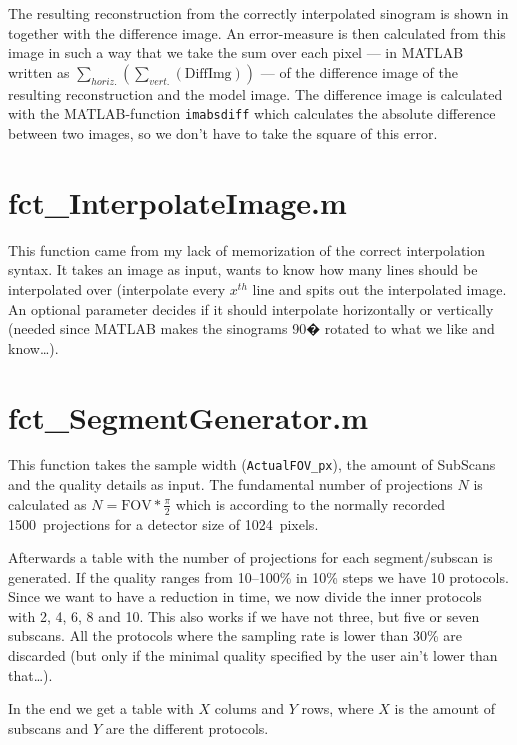 \documentclass{scrartcl}
\begin{document}
The resulting reconstruction from the correctly interpolated sinogram is shown in together with the difference image. An error-measure is then calculated from this image in such a way that we take the sum over each pixel --- in MATLAB written as 
$\sum_{horiz.}(\sum_{vert.} ( \textrm{DiffImg} ) )$
---  of the difference image of the resulting reconstruction and the model image. 
The difference image is calculated with the MATLAB-function \verb+imabsdiff+ which calculates the absolute difference between two images, so we don't have to take the square of this error.

\section{fct\_InterpolateImage.m}
\label{sec:fct_InterpolateImage}
This function came from my lack of memorization of the correct interpolation syntax. It takes an image as input, wants to know how many lines should be interpolated over (interpolate every $x^{th}$ line and spits out the interpolated image. An optional parameter decides if it should interpolate horizontally or vertically (needed since MATLAB makes the sinograms 90� rotated to what we like and know\ldots).

\section{fct\_SegmentGenerator.m}
\label{sec:fct_SegmentGenerator}
This function takes the sample width (\verb+ActualFOV_px+), the amount of SubScans and the quality details as input. The fundamental number of projections $N$ is calculated as $N= \textrm{FOV} * \frac{\pi}{2}$ which is according to the normally recorded 1500~projections for a detector size of 1024~pixels.

Afterwards a table with the number of projections for each segment/subscan is generated. If the quality ranges from 10--100\% in 10\% steps we have 10 protocols. Since we want to have a reduction in time, we now divide the inner protocols with 2, 4, 6, 8 and 10. This also works if we have not three, but five or seven subscans. All the protocols where the sampling rate is lower than 30\% are discarded (but only if the minimal quality specified by the user ain't lower than that\ldots).

In the end we get a table with $X$ colums and $Y$ rows, where $X$ is the amount of subscans and $Y$ are the different protocols.
\end{document}

